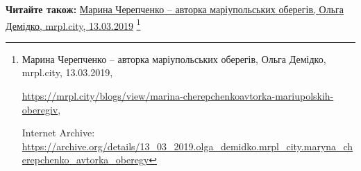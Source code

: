  
 
 
 
 

\textbf{Читайте також:} \href{https://archive.org/details/13_03_2019.olga_demidko.mrpl_city.maryna_cherepchenko_avtorka_oberegy}{%
Марина Черепченко – авторка маріупольських оберегів, Ольга Демідко, mrpl.city, 13.03.2019}%
\footnote{Марина Черепченко – авторка маріупольських оберегів, Ольга Демідко, mrpl.city, 13.03.2019, \par\url{https://mrpl.city/blogs/view/marina-cherepchenkoavtorka-mariupolskih-oberegiv}, \par Internet Archive: \url{https://archive.org/details/13_03_2019.olga_demidko.mrpl_city.maryna_cherepchenko_avtorka_oberegy}}
